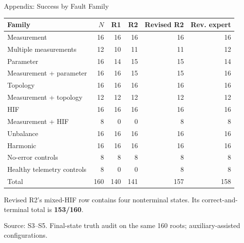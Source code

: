 \documentclass{beamer}
\newcommand{\src}[1]{\par\vfill\begin{minipage}{0.67\textwidth}\tiny\color{gray}Source: #1.\end{minipage}\par}
\begin{document}
\appendix
\begin{frame}{Appendix: Success by Fault Family}
  \footnotesize
  \renewcommand{\arraystretch}{1.08}
  \begin{tabularx}{\textwidth}{Xrrrrr}
    \toprule
    Family & $N$ & R1 & R2 & Revised R2 & Rev. expert \\
    \midrule
    Measurement & 16 & 16 & 16 & 16 & 16 \\
    Multiple measurements & 12 & 10 & 11 & 11 & 12 \\
    Parameter & 16 & 14 & 15 & 15 & 14 \\
    Measurement + parameter & 16 & 16 & 15 & 15 & 16 \\
    Topology & 16 & 16 & 16 & 16 & 16 \\
    Measurement + topology & 12 & 12 & 12 & 12 & 12 \\
    HIF & 16 & 16 & 16 & 16 & 16 \\
    Measurement + HIF & 8 & 0 & 0 & 8 & 8 \\
    Unbalance & 16 & 16 & 16 & 16 & 16 \\
    Harmonic & 16 & 16 & 16 & 16 & 16 \\
    No-error controls & 8 & 8 & 8 & 8 & 8 \\
    Healthy telemetry controls & 8 & 0 & 0 & 8 & 8 \\
    \midrule
    Total & 160 & 140 & 141 & 157 & 158 \\
    \bottomrule
  \end{tabularx}
  \par\vspace{0.5em}
  \small Revised R2's mixed-HIF row contains four nonterminal states. Its correct-and-terminal total is \textbf{153/160}.
  \src{S3--S5. Final-state truth audit on the same 160 roots; auxiliary-assisted configurations}
\end{frame}
\end{document}
